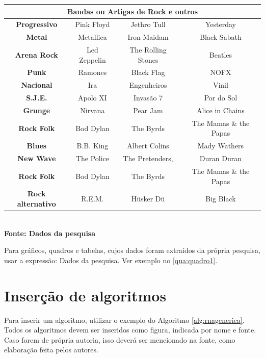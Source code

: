    \begin{quadro}
          \centering
        \label{qua:quadro1}
	\begin{tabular}{|c|c|c|c|} \hline
	\multicolumn{4}{|c|}{\textbf{Bandas ou Artigas de Rock e outros}} 	  \\ 
		\hline \textbf{	Progressivo} & Pink Floyd & Jethro Tull	& Yesterday \\ 
		 \hline \textbf{ Metal}  & Metallica & Iron Maidam & Black Sabath \\ 
		\hline \textbf{	Arena Rock} & Led Zeppelin & The Rolling Stones & Beatles \\ 
		\hline \textbf{ Punk} & Ramones & Black Flag & NOFX	\\ 
		\hline \textbf{	Nacional} & Ira & Engenheiros & Vinil	\\ 
		\hline \textbf{	S.J.E.} & Apolo XI & Invasão 7 & Por do Sol \\ 
		\hline \textbf{	Grunge} & Nirvana & Pear Jam & Alice in Chains	\\ 
		\hline \textbf{	Rock Folk} & Bod Dylan & The Byrds &  The Mamas \& the Papas \\
		\hline \textbf{	Blues} & B.B. King & Albert Colins & Mady Wathers \\ 
		\hline \textbf{	New Wave} & The Police & The Pretenders, &  Duran Duran\\ 
 		\hline \textbf{	Rock Folk} & Bod Dylan & The Byrds &  The Mamas \& the Papas \\
 		\hline \textbf{	Rock alternativo} & R.E.M.& Hüsker Dü & Big Black\\ 
 		\hline
	\end{tabular}
	{\footnotesize\\ \textbf{Fonte: Dados da pesquisa}}
   \end{quadro}

Para gráficos, quadros e tabelas, cujos dados foram extraídos da própria pesquisa, 
 usar a expressão: Dados da pesquisa. Ver exemplo no  \ref{qua:quadro1}.
   

\section{\esp Inserção de algoritmos}

Para inserir um algoritmo, utilizar o exemplo do Algoritmo  \ref{alg:rnagenerica}.
Todos os algoritmos devem ser inseridos como figura, indicada por nome e  fonte. Caso 
forem de própria autoria, isso deverá ser mencionado na fonte, como elaboração feita pelos autores.

